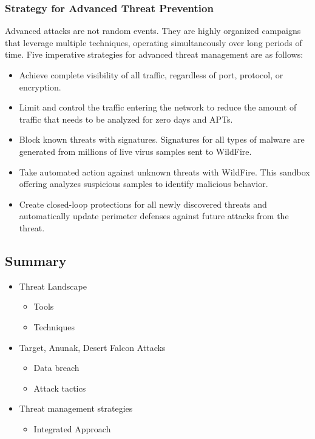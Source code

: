 \subsubsection{Strategy for Advanced Threat Prevention}
Advanced attacks are not random events. They are highly organized campaigns that leverage multiple techniques, operating simultaneously over long periods of time.
\newline
Five imperative strategies for advanced threat management are as follows:
\begin{itemize}
    \item Achieve complete visibility of all traffic, regardless of port, protocol, or encryption.
    \item Limit and control the traffic entering the network to reduce the amount of traffic that needs to be analyzed for zero days and APTs.
    \item Block known threats with signatures.
    Signatures for all types of malware are generated from millions of live virus samples sent to WildFire.
    \item Take automated action against unknown threats with WildFire. This sandbox offering analyzes suspicious samples to identify malicious behavior.
    \item Create closed-loop protections for all newly discovered threats and automatically update perimeter defenses against future attacks from the threat.
\end{itemize}

\subsection{Summary}
\begin{itemize}
    \item Threat Landscape
        \begin{itemize}
            \item Tools
            \item Techniques
        \end{itemize}
    \item Target, Anunak, Desert Falcon Attacks
        \begin{itemize}
            \item Data breach
            \item Attack tactics
        \end{itemize}
    \item Threat management strategies
        \begin{itemize}
            \item Integrated Approach
        \end{itemize}
\end{itemize}